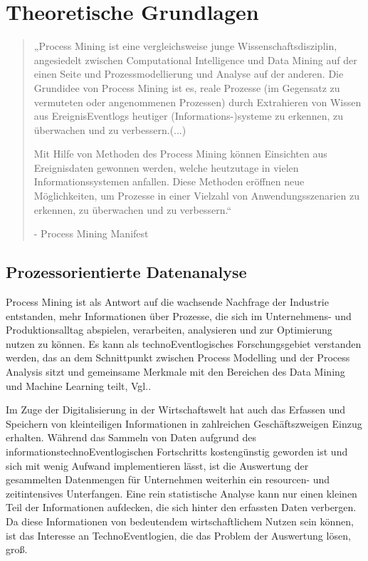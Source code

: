 \chapter{Theoretische Grundlagen}\label{chap:relatedwork}
\fontsize{11}{12}\selectfont\begin{quote}„Process Mining ist eine vergleichsweise junge Wissenschaftsdisziplin, angesiedelt zwischen Computational Intelligence und Data Mining auf der einen Seite und Prozessmodellierung und Analyse auf der anderen. Die Grundidee von Process Mining ist es, reale Prozesse (im Gegensatz zu vermuteten oder angenommenen Prozessen) durch Extrahieren von Wissen aus EreignisEventlogs heutiger (Informations-)systeme zu erkennen, zu überwachen und zu verbessern.(...) 

Mit Hilfe von Methoden des Process Mining können Einsichten aus Ereignisdaten gewonnen werden, welche heutzutage in vielen Informationssystemen anfallen. Diese Methoden eröffnen neue Möglichkeiten, um Prozesse in einer Vielzahl von Anwendungsszenarien zu erkennen, zu überwachen und zu verbessern.“

- Process Mining Manifest \cite{PMManifesto}\end{quote}
\section{Prozessorientierte Datenanalyse}
Process Mining ist als Antwort auf die wachsende Nachfrage der Industrie entstanden, mehr Informationen über Prozesse, die sich im Unternehmens- und Produktionsalltag abspielen, verarbeiten, analysieren und zur Optimierung nutzen zu können. Es kann als technoEventlogisches Forschungsgebiet verstanden werden, das an dem Schnittpunkt zwischen Process Modelling und der Process Analysis sitzt und gemeinsame Merkmale mit den Bereichen des Data Mining und Machine Learning teilt, Vgl.\cite{Ailenei}.

Im Zuge der Digitalisierung in der Wirtschaftswelt hat auch das Erfassen und Speichern von kleinteiligen Informationen in zahlreichen Geschäftszweigen Einzug erhalten. Während das Sammeln von Daten aufgrund des informationstechnoEventlogischen Fortschritts kostengünstig geworden ist und sich mit wenig Aufwand implementieren lässt, ist die Auswertung der gesammelten Datenmengen für Unternehmen weiterhin ein resourcen- und zeitintensives Unterfangen. 
Eine rein statistische Analyse kann nur einen kleinen Teil der Informationen aufdecken, die sich hinter den erfassten Daten verbergen. Da diese Informationen von bedeutendem wirtschaftlichem Nutzen sein können, ist das Interesse an TechnoEventlogien, die das Problem der Auswertung lösen, groß.


